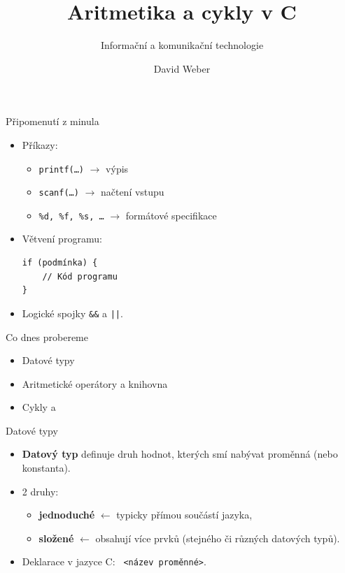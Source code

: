 \documentclass[14pt,aspectratio=169]{beamer}
\subtitle{Informační a komunikační technologie}
\title{Aritmetika a cykly v C}
\author{David Weber}
\begin{document}

    \begin{frame}
        \titlepage
    \end{frame}

    \begin{frame}[t,fragile]{Připomenutí z minula}
        \begin{itemize}
            \item Příkazy:
            \begin{itemize}
                \item \texttt{printf(\dots)} $\rightarrow$ výpis
                \item \texttt{scanf(\dots)} $\rightarrow$ načtení vstupu
                \item \texttt{\%d, \%f, \%s, \dots} $\rightarrow$ formátové specifikace
            \end{itemize}
            \item Větvení programu:
            \begin{lstlisting}
if (podmínka) {
    // Kód programu
}
            \end{lstlisting}
            \item Logické spojky \texttt{\&\&} a \texttt{||}.
        \end{itemize}
    \end{frame}

    \begin{frame}[t]{Co dnes probereme}
        \begin{itemize}
            \item Datové typy
            \item Aritmetické operátory a knihovna 
            \item Cykly  a 
        \end{itemize}
    \end{frame}

    \begin{frame}[t]{Datové typy}
        \begin{itemize}
            \item \textbf{Datový typ} definuje druh hodnot, kterých smí nabývat proměnná (nebo konstanta).
            \item 2 druhy:
            \begin{itemize}
                \item \textbf{jednoduché} $\leftarrow$ typicky přímou součástí jazyka,
                \item \textbf{složené} $\leftarrow$ obsahují více prvků (stejného či různých datových typů).
            \end{itemize}
            \item Deklarace v jazyce C: \texttt{ <název proměnné>}.
        \end{itemize}
    \end{frame}
\end{document}
